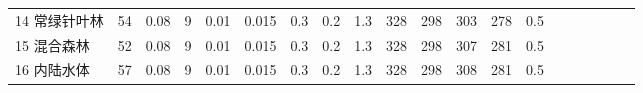 \begin{landscape}
\begin{table}[htbp]
\begin{tabular}{@{}lccccccccccccccccccc@{}}
    14 常绿针叶林   & 54                                                                & 0.08                                                                                                   & 9                                                                                  & 0.01                                                                               & 0.015                                                               & 0.3                                                       & 0.2                                                       & 1.3                                                       & 328                                                             & 298                                                             & 303                                                              & 278                                                               & 0.5                                                          \\
    15 混合森林    & 52                                                                & 0.08                                                                                                   & 9                                                                                  & 0.01                                                                               & 0.015                                                               & 0.3                                                       & 0.2                                                       & 1.3                                                       & 328                                                             & 298                                                             & 307                                                              & 281                                                               & 0.5                                                          \\
    16 内陆水体    & 57                                                                & 0.08                                                                                                   & 9                                                                                  & 0.01                                                                               & 0.015                                                               & 0.3                                                       & 0.2                                                       & 1.3                                                       & 328                                                             & 298                                                             & 308                                                              & 281                                                               & 0.5                                                          \\

\end{tabular}
\end{table}
\end{landscape}
